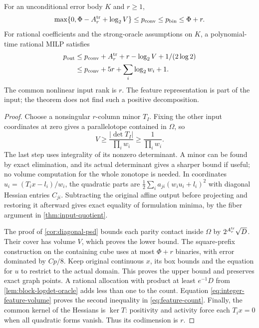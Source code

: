 \begin{theorem}\label{thm:integer-features}
For an unconditional error body $K$ and $r\ge1$,
\begin{equation}\label{eq:feature-finite}
 \max\{0,\Phi-A_r^{\rm tr}+\log_2V\}\le p_{\mathrm{conv}}\le p_{\mathrm{bin}}\le\Phi+r.
\end{equation}
For rational coefficients and the strong-oracle assumptions on $K$, a
polynomial-time rational MILP satisfies
\begin{equation}\label{eq:feature-count}
 \begin{split}
 p_{\rm out}&\le p_{\mathrm{conv}}+A_r^{\rm tr}+r-\log_2V+1/(2\log2)\\
 &\le p_{\mathrm{conv}}+5r+\sum_i\log_2w_i+1.
 \end{split}
\end{equation}
The common nonlinear input rank is $r$. The feature representation is
part of the input; the theorem does not find such a positive
decomposition.
\end{theorem}
\begin{proof}
Choose a nonsingular $r$-column minor $T_I$. Fixing the other input
coordinates at zero gives a parallelotope contained in $\Omega$, so
\begin{equation}\label{eq:integer-feature-volume}
 V\ge\frac{|\det T_I|}{\prod_iw_i}\ge\frac1{\prod_iw_i}.
\end{equation}
The last step uses integrality of its nonzero determinant. A minor can
be found by exact elimination, and its actual determinant gives a sharper
bound if useful; no volume computation for the whole zonotope is needed.
In coordinates $u_i=(T_ix-l_i)/w_i$, the quadratic parts are
$\frac12\sum_i a_{ji}(w_iu_i+l_i)^2$ with diagonal Hessian entries
$C_{ji}$. Subtracting the original affine output before projecting and
restoring it afterward gives exact equality of formulation minima,
by the fiber argument in \cref{thm:input-quotient}.

The proof of \cref{cor:diagonal-psd} bounds each parity contact inside
$\Omega$ by $2^{A_r^{\rm tr}}\sqrt D$. Their cover has volume $V$,
which proves the lower bound. The square-prefix construction on the
containing cube uses at most $\Phi+r$ binaries, with error dominated
by $Cp/8$. Keep original continuous $x$, its box bounds and the equation
for $u$ to restrict to the actual domain. This proves the upper bound
and preserves exact graph points. A rational allocation with product at
least $e^{-1}D$ from \cref{lem:block-logdet-oracle} adds less than one
to the count. Equation \eqref{eq:integer-feature-volume} proves the
second inequality in \eqref{eq:feature-count}.
Finally, the common kernel of the Hessians is $\ker T$: positivity
and activity force each $T_ix=0$ when all quadratic forms vanish.
Thus its codimension is $r$.
\end{proof}

